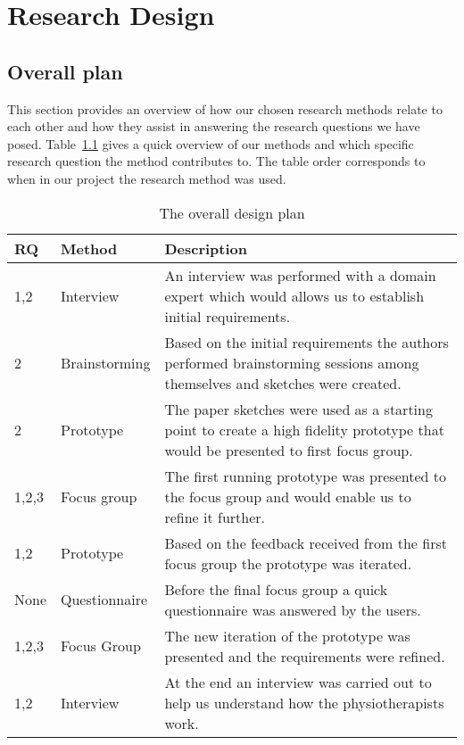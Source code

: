\chapter{Research Design}
\label{ch:researchDesign}
\section{Overall plan}
\label{sec:overview}

This section provides an overview of how our chosen research methods relate to each other and how they assist in answering the research questions we have posed. Table~\ref{tab:designPlan} gives a quick overview of our methods and which specific research question the method contributes to. The table order corresponds to when in our project the research method was used.

\begin{table}[h!]
  \centering
  \begin{tabular}{|p{0.7cm}|p{2cm}|p{9cm}|}
    \hline
    \textbf{RQ} & \textbf{Method} & \textbf{Description} \\ \hline
    1,2 & Interview & An interview was performed with a domain expert which would allows us to establish initial requirements. \\ \hline
    2 & Brainstorming & Based on the initial requirements the authors performed brainstorming sessions among themselves and sketches were created. \\ \hline
    2 & Prototype & The paper sketches were used as a starting point to create a high fidelity prototype that would be presented to first focus group. \\ \hline
    1,2,3 & Focus group & The first running prototype was presented to the focus group and would enable us to refine it further. \\ \hline
    1,2 & Prototype & Based on the feedback received from the first focus group the prototype was iterated. \\ \hline
    None & Questionnaire & Before the final focus group a quick questionnaire was answered by the users. \\ \hline
    1,2,3 & Focus Group & The new iteration of the prototype was presented and the requirements were refined. \\ \hline
    1,2 & Interview & At the end an interview was carried out to help us understand how the physiotherapists work. \\ \hline
  \end{tabular}
  \caption{The overall design plan}
  \label{tab:designPlan}
\end{table}

